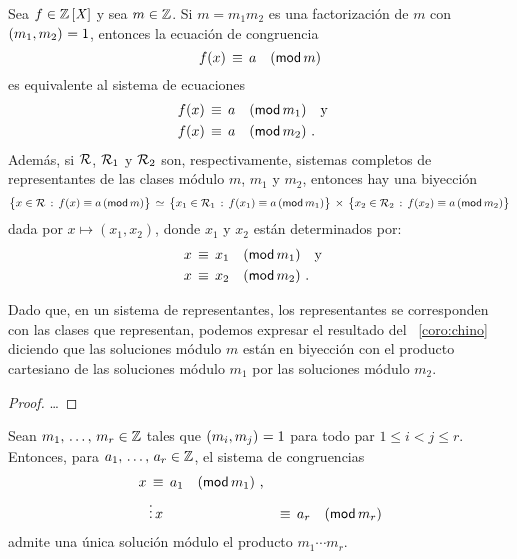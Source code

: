 \begin{coroChino}\label{coro:chino}
	Sea $f\in\polinomios\Enteros$ y sea $m\in\Enteros$.
	Si $m=m_1m_2$ es una factorizaci\'on de $m$ con $\mcd{m_1,m_2}=1$,
	entonces la ecuaci\'on de congruencia
	\begin{equation}
		\label{eq:chino:una}
		f(x)\,\equiv\,a\modulo[m]
	\end{equation}
	es equivalente al sistema de ecuaciones
	\begin{equation}
		\label{eq:chino:dos}
		\begin{aligned}
			f(x) & \,\equiv\,a\modulo[m_1]\dispand \\
			f(x) & \,\equiv\,a\modulo[m_2]\dispstop
		\end{aligned}
	\end{equation}
	Adem\'as, si $\cal R$, $\cal R_1$ y $\cal R_2$ son, respectivamente,
	sistemas completos de representantes de las clases m\'odulo $m$,
	$m_1$ y $m_2$, entonces hay una biyecci\'on
	\begin{displaymath}
		\big\{x\in\cal R\,:\,f(x)\equiv a\tmodulo[m]\big\}
			\,\simeq\,
		\big\{x_1\in\cal R_1\,:\,f(x_1)\equiv a\tmodulo[m_1]\big\}
		\,\times\,
		\big\{x_2\in\cal R_2\,:\,f(x_2)\equiv a\tmodulo[m_2]\big\}
	\end{displaymath}
	dada por $x\mapsto (x_1,x_2)$, donde $x_1$ y $x_2$ est\'an
	determinados por:
	\begin{displaymath}
		\begin{aligned}
			x & \,\equiv\,x_1\modulo[m_1]\dispand \\
			x & \,\equiv\,x_2\modulo[m_2]\dispstop
		\end{aligned}
	\end{displaymath}
\end{coroChino}

\begin{obsChino}\label{obs:chino:coro}
	Dado que, en un sistema de representantes, los representantes se
	corresponden con las clases que representan, podemos expresar el
	resultado del \coroname~\ref{coro:chino} diciendo que
	las soluciones m\'odulo $m$ est\'an en biyecci\'on
	con el producto cartesiano de las soluciones m\'odulo $m_1$ por
	las soluciones m\'odulo $m_2$.
\end{obsChino}

\begin{proof}
	\dots
\end{proof}

\begin{coroChino}\label{coro:chino:varios}
	Sean $\lista m r\in\Enteros$ tales que $\mcd{m_i,m_j}=1$
	para todo par $1\leq i<j\leq r$. Entonces, para
	$\lista a r\in\Enteros$, el sistema de congruencias
	\begin{displaymath}
		\begin{aligned}
			x & \,\equiv\,a_1\modulo[m_1] \dispcomma \\
			& \vdots
			x & \,\equiv\,a_r\modulo[m_r]
		\end{aligned}
	\end{displaymath}
	admite una \'unica soluci\'on m\'odulo el producto
	$m_1\cdots m_r$.
\end{coroChino}

